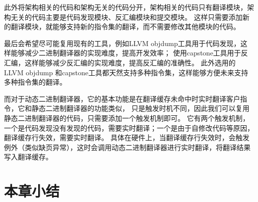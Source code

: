 此外将架构相关的代码和架构无关的代码分开，架构相关的代码只有翻译模块，架构无关的代码主要是代码发现模块、反汇编模块和提交模块。
这样只需要添加新的翻译模块，就能够支持新的指令集的翻译，而不需要修改其他模块的代码。

最后会希望尽可能复用现有的工具，例如LLVM objdump工具用于代码发现，这样能够减少二进制翻译器的实现难度，提高开发效率；
使用capstone工具用于反汇编，这样能够减少反汇编的实现难度，提高反汇编的准确性。
此外选用的LLVM objdump 和capstone工具都天然支持多种指令集，这样能够方便未来支持多种指令集的翻译。


而对于动态二进制翻译器，它的基本功能是在翻译缓存未命中时实时翻译客户指令，它和静态二进制翻译器的功能类似，
只是触发时机不同，因此我们可以复用静态二进制翻译器的代码，只需要添加一个触发机制即可。
它有两个触发机制，一个是代码发现没有发现的代码，需要实时翻译；一个是由于自修改代码等原因，翻译缓存行失效，需要实时翻译。
具体在硬件上，当翻译缓存行失效时，会触发例外（类似缺页异常），这时会调用动态二进制翻译器进行实时翻译，将翻译结果写入翻译缓存。


\section{本章小结}





